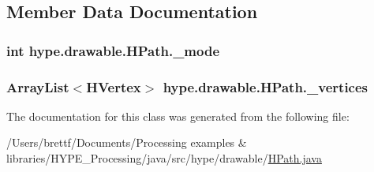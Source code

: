 \subsection{Member Data Documentation}
\hypertarget{classhype_1_1drawable_1_1_h_path_ac3f65fdd8abc15cf5a2d9f007282b33a}{
\subsubsection[{\-\_\-mode}]{\setlength{\rightskip}{0pt plus 5cm}int hype.\-drawable.\-H\-Path.\-\_\-mode\hspace{0.3cm}{\ttfamily [protected]}}}\label{classhype_1_1drawable_1_1_h_path_ac3f65fdd8abc15cf5a2d9f007282b33a}
\hypertarget{classhype_1_1drawable_1_1_h_path_a61f9c092fff56509a72121fb4e707611}{
\subsubsection[{\-\_\-vertices}]{\setlength{\rightskip}{0pt plus 5cm}Array\-List$<$H\-Vertex$>$ hype.\-drawable.\-H\-Path.\-\_\-vertices\hspace{0.3cm}{\ttfamily [protected]}}}\label{classhype_1_1drawable_1_1_h_path_a61f9c092fff56509a72121fb4e707611}


The documentation for this class was generated from the following file\-:\begin{DoxyCompactItemize}
\item 
/\-Users/brettf/\-Documents/\-Processing examples \& libraries/\-H\-Y\-P\-E\-\_\-\-Processing/java/src/hype/drawable/\hyperlink{_h_path_8java}{H\-Path.\-java}\end{DoxyCompactItemize}
